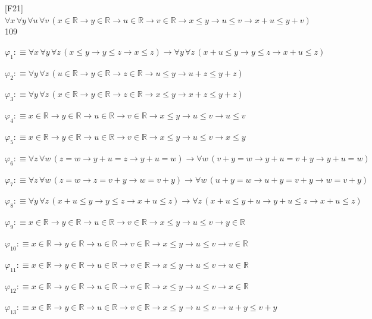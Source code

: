 \begin{fullproof}{[F21]}{$\forall x\,\forall y\,\forall u\,\forall v\,(x \in \mathbb{R} \to y \in \mathbb{R} \to u \in \mathbb{R} \to v \in \mathbb{R} \to x \leq y \to u \leq v \to x + u \leq y + v)$}{109}
\begin{ptree}
\end{ptree}
\begin{abbrevlist}
\item $\varphi_{1} :\equiv \forall x\,\forall y\,\forall z\,(x \leq y \to y \leq z \to x \leq z) \to \forall y\,\forall z\,(x + u \leq y \to y \leq z \to x + u \leq z)$
\item $\varphi_{2} :\equiv \forall y\,\forall z\,(u \in \mathbb{R} \to y \in \mathbb{R} \to z \in \mathbb{R} \to u \leq y \to u + z \leq y + z)$
\item $\varphi_{3} :\equiv \forall y\,\forall z\,(x \in \mathbb{R} \to y \in \mathbb{R} \to z \in \mathbb{R} \to x \leq y \to x + z \leq y + z)$
\item $\varphi_{4} :\equiv x \in \mathbb{R} \to y \in \mathbb{R} \to u \in \mathbb{R} \to v \in \mathbb{R} \to x \leq y \to u \leq v \to u \leq v$
\item $\varphi_{5} :\equiv x \in \mathbb{R} \to y \in \mathbb{R} \to u \in \mathbb{R} \to v \in \mathbb{R} \to x \leq y \to u \leq v \to x \leq y$
\item $\varphi_{6} :\equiv \forall z\,\forall w\,(z = w \to y + u = z \to y + u = w) \to \forall w\,(v + y = w \to y + u = v + y \to y + u = w)$
\item $\varphi_{7} :\equiv \forall z\,\forall w\,(z = w \to z = v + y \to w = v + y) \to \forall w\,(u + y = w \to u + y = v + y \to w = v + y)$
\item $\varphi_{8} :\equiv \forall y\,\forall z\,(x + u \leq y \to y \leq z \to x + u \leq z) \to \forall z\,(x + u \leq y + u \to y + u \leq z \to x + u \leq z)$
\item $\varphi_{9} :\equiv x \in \mathbb{R} \to y \in \mathbb{R} \to u \in \mathbb{R} \to v \in \mathbb{R} \to x \leq y \to u \leq v \to y \in \mathbb{R}$
\item $\varphi_{10} :\equiv x \in \mathbb{R} \to y \in \mathbb{R} \to u \in \mathbb{R} \to v \in \mathbb{R} \to x \leq y \to u \leq v \to v \in \mathbb{R}$
\item $\varphi_{11} :\equiv x \in \mathbb{R} \to y \in \mathbb{R} \to u \in \mathbb{R} \to v \in \mathbb{R} \to x \leq y \to u \leq v \to u \in \mathbb{R}$
\item $\varphi_{12} :\equiv x \in \mathbb{R} \to y \in \mathbb{R} \to u \in \mathbb{R} \to v \in \mathbb{R} \to x \leq y \to u \leq v \to x \in \mathbb{R}$
\item $\varphi_{13} :\equiv x \in \mathbb{R} \to y \in \mathbb{R} \to u \in \mathbb{R} \to v \in \mathbb{R} \to x \leq y \to u \leq v \to u + y \leq v + y$

\end{abbrevlist}
\end{fullproof}
